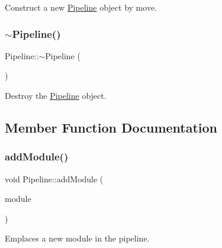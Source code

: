 Construct a new \mbox{\hyperlink{classo_z_1_1_pipeline}{Pipeline}} object by move. 

\mbox{\label{classo_z_1_1_pipeline_ae273add0ea7490c0ca4c13cb3683ec6f}} 
\subsubsection{\texorpdfstring{$\sim$Pipeline()}{~Pipeline()}}
{\footnotesize\ttfamily Pipeline\+::$\sim$\+Pipeline (\begin{DoxyParamCaption}\item[{void}]{ }\end{DoxyParamCaption})\hspace{0.3cm}{\ttfamily [virtual]}}



Destroy the \mbox{\hyperlink{classo_z_1_1_pipeline}{Pipeline}} object. 



\subsection{Member Function Documentation}
\mbox{\label{classo_z_1_1_pipeline_aa96f1ef3faeb41c9966d6b5a103fa3a5}} 
\subsubsection{\texorpdfstring{addModule()}{addModule()}\hspace{0.1cm}{\footnotesize\ttfamily [1/2]}}
{\footnotesize\ttfamily void Pipeline\+::add\+Module (\begin{DoxyParamCaption}\item[{\mbox{\hyperlink{namespaceo_z_af5a56aaaee027504979038f38991adcf}{Module\+Ptr}} \&\&}]{module }\end{DoxyParamCaption})}



Emplaces a new module in the pipeline. 

\mbox{\label{classo_z_1_1_pipeline_a797f98947aace930fbb15cd6b2d9f726}} 
